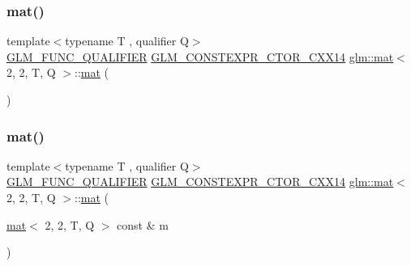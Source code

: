 \subsubsection{\texorpdfstring{mat()}{mat()}\hspace{0.1cm}{\footnotesize\ttfamily [1/21]}}
{\footnotesize\ttfamily template$<$typename T , qualifier Q$>$ \\
\mbox{\hyperlink{setup_8hpp_a33fdea6f91c5f834105f7415e2a64407}{G\+L\+M\+\_\+\+F\+U\+N\+C\+\_\+\+Q\+U\+A\+L\+I\+F\+I\+ER}} \mbox{\hyperlink{setup_8hpp_a0900f9145e68bf6061b6f5e7be3fa751}{G\+L\+M\+\_\+\+C\+O\+N\+S\+T\+E\+X\+P\+R\+\_\+\+C\+T\+O\+R\+\_\+\+C\+X\+X14}} \mbox{\hyperlink{structglm_1_1mat}{glm\+::mat}}$<$ 2, 2, T, Q $>$\+::\mbox{\hyperlink{structglm_1_1mat}{mat}} (\begin{DoxyParamCaption}{ }\end{DoxyParamCaption})}

\mbox{\label{structglm_1_1mat_3_012_00_012_00_01_t_00_01_q_01_4_aa45ca90831c32104d9c29f84ec0b9dac}} 
\subsubsection{\texorpdfstring{mat()}{mat()}\hspace{0.1cm}{\footnotesize\ttfamily [2/21]}}
{\footnotesize\ttfamily template$<$typename T , qualifier Q$>$ \\
\mbox{\hyperlink{setup_8hpp_a33fdea6f91c5f834105f7415e2a64407}{G\+L\+M\+\_\+\+F\+U\+N\+C\+\_\+\+Q\+U\+A\+L\+I\+F\+I\+ER}} \mbox{\hyperlink{setup_8hpp_a0900f9145e68bf6061b6f5e7be3fa751}{G\+L\+M\+\_\+\+C\+O\+N\+S\+T\+E\+X\+P\+R\+\_\+\+C\+T\+O\+R\+\_\+\+C\+X\+X14}} \mbox{\hyperlink{structglm_1_1mat}{glm\+::mat}}$<$ 2, 2, T, Q $>$\+::\mbox{\hyperlink{structglm_1_1mat}{mat}} (\begin{DoxyParamCaption}\item[{\mbox{\hyperlink{structglm_1_1mat}{mat}}$<$ 2, 2, T, Q $>$ const \&}]{m }\end{DoxyParamCaption})}

\mbox{\label{structglm_1_1mat_3_012_00_012_00_01_t_00_01_q_01_4_a0e9852f49f319a99409e663be26c089e}} 
